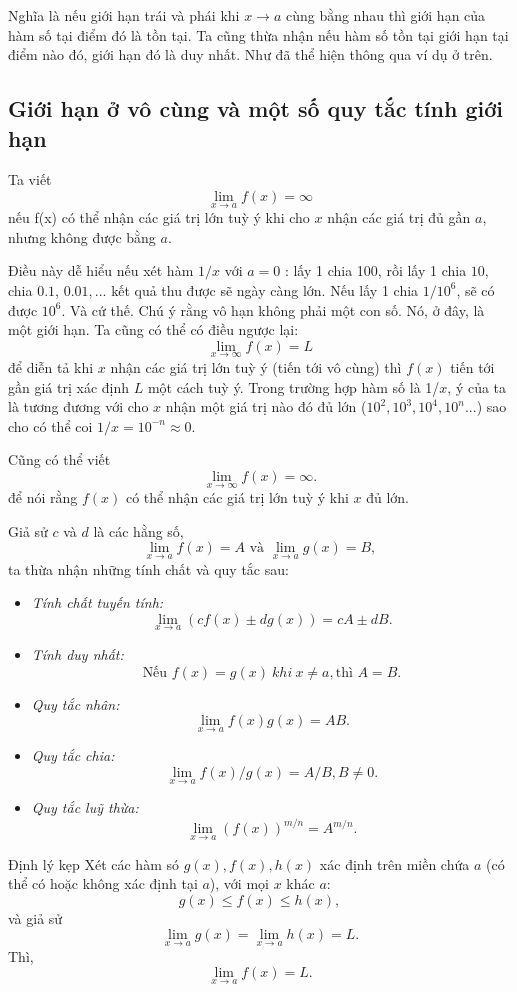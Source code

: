 Nghĩa là nếu giới hạn trái và phái khi $x\rightarrow a$ cùng bằng nhau thì giới hạn của hàm số tại điểm đó là tồn tại.
Ta cũng thừa nhận nếu hàm số tồn tại giới hạn tại điểm nào đó, giới hạn đó là duy nhất. Như đã thể hiện thông qua ví dụ ở trên.

\subsection{Giới hạn ở vô cùng và một số quy tắc tính giới hạn}
\begin{definition} Ta viết
    \begin{equation*}\lim_{x\rightarrow a}f(x)=\infty\end{equation*}
nếu f(x) có thể nhận các giá trị lớn tuỳ ý khi cho $x$ nhận các giá trị đủ gần $a$, nhưng không được bằng $a$.
\end{definition}
Điều này dễ hiểu nếu xét hàm $1/x$ với $a=0$ : lấy 1 chia 100, rồi lấy 1 chia $10$, chia $0.1$, $0.01,...$ kết quả thu được sẽ ngày càng lớn. Nếu lấy 1 chia $1/10^6$, sẽ có được $10^6$. Và cứ thế.
Chú ý rằng vô hạn không phải một con số. Nó, ở đây, là một giới hạn.\newline
Ta cũng có thể có điều ngược lại:$$\lim_{x\rightarrow\infty}f(x)=L$$ để diễn tả khi $x$ nhận các giá trị lớn tuỳ ý (tiến tới vô cùng) thì $f(x)$ tiến tới gần giá trị xác định $L$ một cách tuỳ ý. Trong trường hợp hàm số là 1/$x$, ý của ta là tương đương với cho $x$ nhận một giá trị nào đó đủ lớn ($10^2,10^3,10^4,10^n...$) sao cho có thể coi $1/x =10^{-n}\approx 0.$ 

Cũng có thể viết  $$\lim_{x\rightarrow\infty}f(x)=\infty.$$ để nói rằng $f(x)$ có thể nhận các giá trị lớn tuỳ ý khi $x$ đủ lớn.\newline    
\vspace{5pt}

 Giả sử $c$ và $d$ là các hằng số, \[\lim_{x\rightarrow a}f(x)=A \text{ và } \lim_{x\rightarrow a}g(x)=B, \] ta thừa nhận những tính chất và quy tắc sau:
\begin{itemize}
 \item \emph{Tính chất tuyến tính:} \[\lim_{x\rightarrow a}(cf(x)\pm dg(x))=cA \pm dB.\]
 \item \emph{Tính duy nhất:} \[\text{Nếu } f(x)=g(x)~khi~x\neq a,\text{thì } A=B.\]
 \item \emph{Quy tắc nhân:} \[\lim_{x\rightarrow a}f(x)g(x)=AB.\]
 \item \emph{Quy tắc chia:} \[\lim_{x\rightarrow a}f(x)/g(x)=A/B, B\neq 0.\]
 \item \emph{Quy tắc luỹ thừa:} \[\lim_{x\rightarrow a}(f(x))^{m/n}=A^{m/n}.\]
\end{itemize}
\begin{theorem}{Định lý kẹp}
    Xét các hàm só $g(x), f(x), h(x)$ xác định trên miền chứa $a$ (có thể có hoặc không xác định tại $a$), với mọi $x$ khác $a$:
    \[g(x)\leq f(x)\leq h(x),\] và giả sử \[\lim_{x\rightarrow a}g(x)=\lim_{x\rightarrow a}h(x)=L.\]
    Thì, \[\lim_{x\rightarrow a}f(x)=L.\]
\end{theorem}